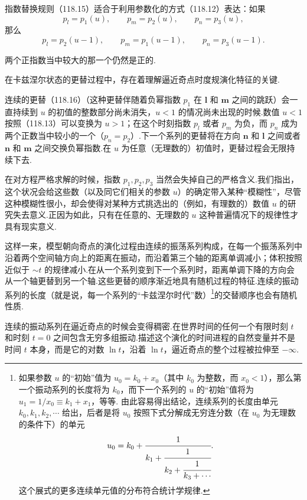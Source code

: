指数替换规则（118.15）适合于利用参数化的方式（118.12）表达：如果
\begin{equation*}
  p_{l}=p_{1}(u),\qquad p_{m}=p_{2}(u),\qquad p_{n}=p_{3}(u),
\end{equation*}
那么
\begin{equation}
  p_{l}=p_{2}(u-1),\qquad
  p_{m}=p_{1}(u-1),\qquad
  p_{n}=p_{3}(u-1).
\end{equation}

两个正指数当中较大的那一个仍然是正的.

在卡兹涅尔状态的更替过程中，存在着理解逼近奇点时度规演化特征的关键.

连续的更替（118.16）（这种更替伴随着负幂指数 $p_{1}$ 在 $\boldsymbol{l}$ 和 $\boldsymbol{m}$ 之间的跳跃）会一直持续到 $u$ 的初值的整数部分尚未消失，$u<1$ 的情况尚未出现的时候.数值 $u<1$ 按照（118.13）可以变换为 $u>1$；在这个时刻指数 $p_{l}$ 或者 $p_{m}$ 为负，而 $p_{n}$ 成为两个正数当中较小的一个（$p_{n}=p_{2}$）.下一个系列的更替将在方向 $\boldsymbol{n}$ 和 $\boldsymbol{l}$ 之间或者 $\boldsymbol{n}$ 和 $\boldsymbol{m}$ 之间交换负幂指数.在 $u$ 为任意（无理数的）初值时，更替过程会无限持续下去.

在对方程严格求解的时候，指数 $p_{1},p_{2},p_{3}$ 当然会失掉自己的严格含义.我们指出，这个状况会给这些数（以及同它们相关的参数 $u$）的确定带入某种“模糊性”，尽管这种模糊性很小，却会使得对某种方式挑选出的（例如，有理数的）数值 $u$ 的研究失去意义.正因为如此，只有在任意的、无理数的 $u$ 这种普遍情况下的规律性才具有现实意义.

这样一来，模型朝向奇点的演化过程由连续的振荡系列构成，在每一个振荡系列中沿着两个空间轴方向上的距离在振动，而沿着第三个轴的距离单调减小；体积按照近似于 $\sim t$ 的规律减小.在从一个系列变到下一个系列时，距离单调下降的方向会从一个轴更替到另一个轴.这些更替的顺序渐近地具有随机过程的特征.连续的振动系列的长度（就是说，每一个系列的“卡兹涅尔时代”数）\footnote{如果参数 $u$ 的“初始”值为 $u_{0}=k_{0}+x_{0}$（其中 $k_{0}$ 为整数，而 $x_{0}<1$），那么第一个振动系列的长度将为 $k_{0}$，而下一个系列的 $u$ 的“初始”值将为 $u_{1}=1/x_{0}\equiv k_{1}+x_{1}$，等等. 由此容易得出结论，连续系列的长度由单元 $k_{0},k_{1},k_{2},\cdots$ 给出，后者是将 $u_{0}$ 按照下式分解成无穷连分数（在 $u_{0}$ 为无理数的条件下）的单元
\[
u_{0}=k_{0}+\cfrac{1}{k_{1}+\cfrac{1}{k_{2}+\cfrac{1}{k_{3}+\cdots}}}.
\]
这个展式的更多连续单元值的分布符合统计学规律.}的交替顺序也会有随机性质.

连续的振动系列在逼近奇点的时候会变得稠密.在世界时间的任何一个有限时刻 $t$ 和时刻 $t=0$ 之间包含无穷多组振动.描述这个演化的时间进程的自然变量并不是时间 $t$ 本身，而是它的对数 $\ln t$，沿着 $\ln t$，逼近奇点的整个过程被拉伸至 $-\infty$.

